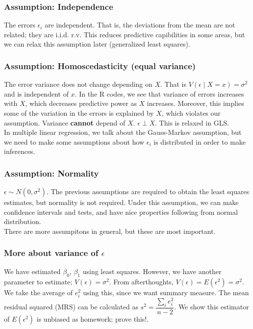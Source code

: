 \documentclass[12pt, a4paper]{article}
\theoremstyle{definition}
\newcommand{\eps}{\epsilon}
\newcommand{\df}{\dfrac}
\begin{document}
	\subsubsection{Assumption: Independence}
	The errors $\eps_i$ are independent. That is, the deviations from the mean are not related; they are i.i.d. r.v. This reduces predictive capibilities in some areas, but we can relax this assumption later (generalized least squares).
	
	\subsubsection{Assumption: Homoscedasticity (equal variance)}
	The error variance does not change depending on $X$. That is $V(\eps \mid X = x) = \sigma^2$ and is independent of $x$. In the R codes, we see that variance of errors increases with $X$, which decreases predictive power as $X$ increases. Moreover, this implies some of the variation in the errors is explained by $X$, which violates our assumption. Variance {\bf cannot} depend of $X$. $\eps \perp X$. This is relaxed in GLS.\\
	
	 In multiple linear regression, we talk about the Gauss-Markov assumption, but we need to make some assumptions about how $\eps_i$ is distributed in order to make inferences.
	
	\subsubsection{Assumption: Normality}
	$\eps \sim N(0, \sigma^2)$. The previous assumptions are required to obtain the least squares estimates, but normality is not required. Under this assumption, we can make confidence intervals and tests, and have nice properties following from normal distribution.\\
	
	There are more assumpitons in general, but these are most important.
	
	\subsubsection{More about variance of $\eps$}
	We have estimated $\beta_0$, $\beta_1$ using least squares. However, we have another parameter to estimate; $V(\eps) = \sigma^2$. From afterthoughts, $V(\eps) = E(\eps^2) = \sigma^2$. We take the average of $e_i^2$ using this, since we want summary measure. The mean residual squared (MRS) can be calculated as $s^2 = \df{\sum_i e_i^2}{n-2}$. We show this estimator of $E(\eps^2)$ is unbiased as homework; prove this!.
	
\end{document}
